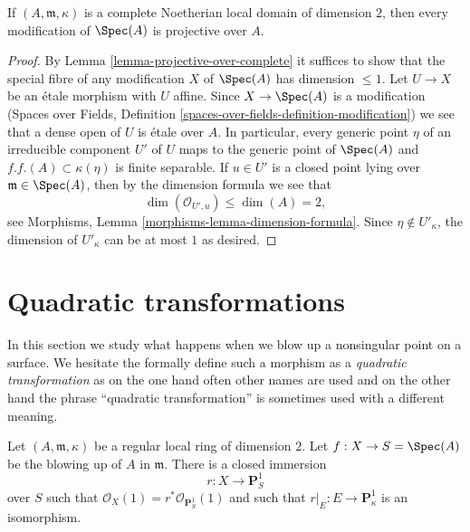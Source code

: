 \begin{lemma}
\label{lemma-modification-of-dim-2-is-projective-over-complete}
If $(A, \mathfrak m, \kappa)$ is a complete Noetherian local domain
of dimension $2$, then every modification of $\Spec(A)$ is projective over $A$.
\end{lemma}

\begin{proof}
By Lemma \ref{lemma-projective-over-complete} it suffices to show that
the special fibre of any modification $X$ of $\Spec(A)$ has dimension
$\leq 1$. Let $U \to X$ be an \'etale morphism with $U$ affine.
Since $X \to \Spec(A)$ is a modification (Spaces over Fields, Definition
\ref{spaces-over-fields-definition-modification})
we see that a dense open of $U$ is \'etale over $A$.
In particular, every generic point $\eta$ of an irreducible component
$U'$ of $U$ maps to the generic point of $\Spec(A)$ and
$f.f.(A) \subset \kappa(\eta)$ is finite separable.
If $u \in U'$ is a closed point lying over $\mathfrak m \in \Spec(A)$,
then by the dimension formula we see that
$$
\dim(\mathcal{O}_{U', u}) \leq \dim(A) = 2,
$$
see Morphisms, Lemma \ref{morphisms-lemma-dimension-formula}.
Since $\eta \not \in U'_\kappa$, the dimension of $U'_\kappa$
can be at most $1$ as desired.
\end{proof}





\section{Quadratic transformations}
\label{section-quadratic}

\noindent
In this section we study what happens when we blow up a nonsingular point
on a surface. We hesitate the formally define such a morphism as a
{\it quadratic transformation} as on the one hand often other names are
used and on the other hand the phrase ``quadratic transformation'' is
sometimes used with a different meaning.

\begin{lemma}
\label{lemma-blowup}
Let $(A, \mathfrak m, \kappa)$ be a regular local ring of dimension $2$.
Let $f : X \to S = \Spec(A)$ be the blowing up of $A$ in $\mathfrak m$.
There is a closed immersion
$$
r : X \longrightarrow \mathbf{P}^1_S
$$
over $S$ such that $\mathcal{O}_X(1) = r^*\mathcal{O}_{\mathbf{P}^1_S}(1)$
and such that $r|_E : E \to \mathbf{P}^1_\kappa$ is an isomorphism.
\end{lemma}

